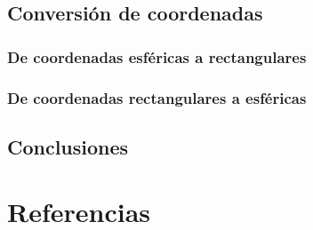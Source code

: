 \documentclass[letterpaper,14pt]{extreport} %
\begin{document}
    \section{Conversión de coordenadas}
      

      \subsection{De coordenadas esféricas a rectangulares}
          

      \subsection{De coordenadas rectangulares a esféricas}
          

    \section{Conclusiones}
      

  \chapter{Referencias}
    
\end{document}
